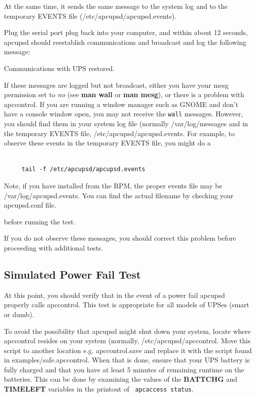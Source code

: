 {{At the same time, it sends the same message to the system log and to the
temporary EVENTS file (/etc/apcupsd/apcupsd.events).  

Plug the serial port plug back into your computer, and within about 12
seconds, apcupsd should reestablish communications and broadcast and log the
following message:  

Communications with UPS restored.  

If these messages are logged but not broadcast, either you have your mesg
permission set to {\it no} (see {\bf man wall} or {\bf man mesg}), or there is
a problem with apccontrol. If you are running a window manager such as GNOME
and don't have a console window open, you may not receive the {\tt wall}
messages. However, you should find them in your system log file (normally
/var/log/messages and in the temporary EVENTS file,
/etc/apcupsd/apcupsd.events. For example, to observe these events in the
temporary EVENTS file, you might do a 

\footnotesize
\begin{verbatim}
     
     tail -f /etc/apcupsd/apcupsd.events
\end{verbatim}
\normalsize

Note, if you have installed from the RPM, the proper events file may be
/var/log/apcupsd.events. You can find the actual filename by checking your
apcupsd.conf file.  

before running the test.  

If you do not observe these messages, you should correct this problem before
proceeding with additional tests. 

\label{Simulated-Power-Fail-Test}

\subsection*{Simulated Power Fail Test}

\label{index-Testing_002c-Simulate-Power-Fail-93}
\label{index-Simulate-Power-Fail-Test-94}
At this point, you should verify that in the event of a power fail apcupsd
properly calls apccontrol. This test is appropriate for all models of UPSes
(smart or dumb).  

To avoid the possibility that apcupsd might shut down your system, locate
where apccontrol resides on your system (normally, /etc/apcupsd/apccontrol.
Move this script to another location e.g. apccontrol.save and replace it with
the script found in examples/safe.apccontrol. When that is done, ensure that
your UPS battery is fully charged and that you have at least 5 minutes of
remaining runtime on the batteries. This can be done by examining the values
of the {\bf BATTCHG} and {\bf TIMELEFT} variables in the printout of {\tt
apcaccess status}.  

}}
